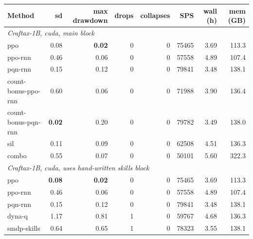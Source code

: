 \begin{tabular}{lrrrrrrr}
\toprule
Method & sd & max drawdown & drops & collapses & SPS & wall (h) & mem (GB) \\
\midrule
\multicolumn{8}{l}{\emph{Craftax-1B, cuda, main block}} \\
ppo & 0.08 & \textbf{0.02} & 0 & 0 & 75465 & 3.69 & 113.3 \\
ppo-rnn & 0.46 & 0.06 & 0 & 0 & 57558 & 4.89 & 107.4 \\
pqn-rnn & 0.15 & 0.12 & 0 & 0 & 79841 & 3.48 & 138.1 \\
count-bonus-ppo-rnn & 0.60 & 0.06 & 0 & 0 & 71988 & 3.90 & 136.4 \\
count-bonus-pqn-rnn & \textbf{0.02} & 0.20 & 0 & 0 & 79782 & 3.49 & 138.0 \\
sil & 0.11 & 0.09 & 0 & 0 & 62508 & 4.51 & 136.3 \\
combo & 0.55 & 0.07 & 0 & 0 & 50101 & 5.60 & 322.3 \\
\midrule
\multicolumn{8}{l}{\emph{Craftax-1B, cuda, uses hand-written skills block}} \\
ppo & \textbf{0.08} & \textbf{0.02} & 0 & 0 & 75465 & 3.69 & 113.3 \\
ppo-rnn & 0.46 & 0.06 & 0 & 0 & 57558 & 4.89 & 107.4 \\
pqn-rnn & 0.15 & 0.12 & 0 & 0 & 79841 & 3.48 & 138.1 \\
dyna-q & 1.17 & 0.81 & 1 & 0 & 59767 & 4.68 & 136.3 \\
smdp-skills & 0.64 & 0.65 & 1 & 0 & 78323 & 3.55 & 138.1 \\
\bottomrule
\end{tabular}
